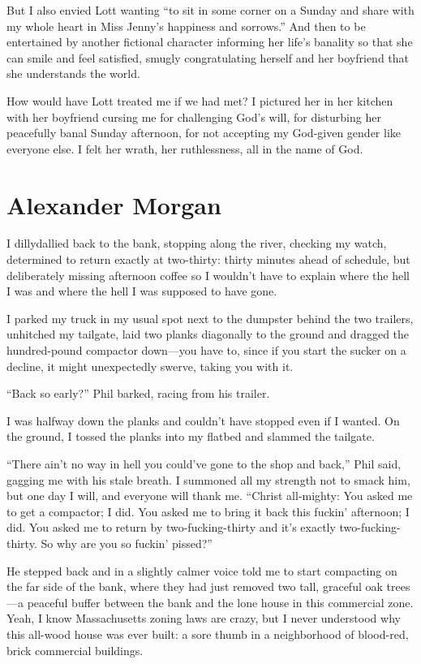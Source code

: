 But I also envied Lott wanting ``to sit in some corner on a Sunday and
share with my whole heart in Miss Jenny's happiness and sorrows.'' And
then to be entertained by another fictional character informing her
life's banality so that she can smile and feel satisfied, smugly
congratulating herself and her boyfriend that she understands the world.

How would have Lott treated me if we had met? I pictured her in her
kitchen with her boyfriend cursing me for challenging God's will, for
disturbing her peacefully banal Sunday afternoon, for not accepting my
God-given gender like everyone else. I felt her wrath, her ruthlessness,
all in the name of God.

\chapter{Alexander Morgan}

\titlemark

I dillydallied back to the bank, stopping along the river, checking my
watch, determined to return exactly at two-thirty: thirty minutes ahead
of schedule, but deliberately missing afternoon coffee so I wouldn't
have to explain where the hell I was and where the hell I was supposed
to have gone.

I parked my truck in my usual spot next to the dumpster behind the two
trailers, unhitched my tailgate, laid two planks diagonally to the
ground and dragged the hundred-pound compactor down---you have to, since
if you start the sucker on a decline, it might unexpectedly swerve,
taking you with it.

``Back so early?'' Phil barked, racing from his trailer.

I was halfway down the planks and couldn't have stopped even if I
wanted. On the ground, I tossed the planks into my flatbed and slammed
the tailgate.

``There ain't no way in hell you could've gone to the shop and back,''
Phil said, gagging me with his stale breath. I summoned all my strength
not to smack him, but one day I will, and everyone will thank me.
``Christ all-mighty: You asked me to get a compactor; I did. You asked
me to bring it back this fuckin' afternoon; I did. You asked me to
return by two-fucking-thirty and it's exactly two-fucking-thirty. So why
are you so fuckin' pissed?''

He stepped back and in a slightly calmer voice told me to start
compacting on the far side of the bank, where they had just removed two
tall, graceful oak trees---a peaceful buffer between the bank and the
lone house in this commercial zone. Yeah, I know Massachusetts zoning
laws are crazy, but I never understood why this all-wood house was ever
built: a sore thumb in a neighborhood of blood-red, brick commercial
buildings.

